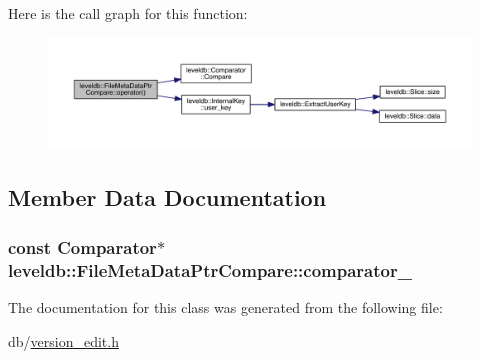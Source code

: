 Here is the call graph for this function\+:\nopagebreak
\begin{figure}[H]
\begin{center}
\leavevmode
\includegraphics[width=350pt]{classleveldb_1_1_file_meta_data_ptr_compare_a42bfcffb808dba83315e5fbb11a22acb_cgraph}
\end{center}
\end{figure}




\subsection{Member Data Documentation}
\hypertarget{classleveldb_1_1_file_meta_data_ptr_compare_a835f130779bd73e71cc17963a1ee8f2c}{}
\subsubsection[{comparator\+\_\+}]{\setlength{\rightskip}{0pt plus 5cm}const {\bf Comparator}$\ast$ leveldb\+::\+File\+Meta\+Data\+Ptr\+Compare\+::comparator\+\_\+\hspace{0.3cm}{\ttfamily [protected]}}\label{classleveldb_1_1_file_meta_data_ptr_compare_a835f130779bd73e71cc17963a1ee8f2c}


The documentation for this class was generated from the following file\+:\begin{DoxyCompactItemize}
\item 
db/\hyperlink{version__edit_8h}{version\+\_\+edit.\+h}\end{DoxyCompactItemize}
